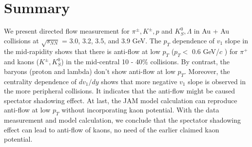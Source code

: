 \section{Summary}

We present directed flow measurement for $\pi^{\pm}, K^{\pm}, p$ and $K^0_S, \Lambda$
in Au + Au collisions at $\sqrt{s_{NN}}$ = 3.0, 3.2, 3.5, and 3.9 GeV.
The $p_T$ dependence of $v_1$ slope in the mid-rapidity shows
that there is anti-flow at low $p_T$ ($p_T <$ 0.6 GeV/$c$ ) for $\pi^{+}$ and kaons ($K^{\pm}, K^0_S$) in the mid-central 10 - 40\% collisions.
By contrast, the baryons (proton and lambda) don't show anti-flow at low $p_T$.
Moreover, the centrality dependence of $dv_1/dy$ shows
that more negative $v_1$ slope is observed in the more peripheral collisions.
It indicates that the anti-flow might be caused spectator shadowing effect.
At last, the JAM model calculation can reproduce anti-flow at low $p_T$ without incorporating kaon potential.
With the data measurement and model calculation,
we conclude that the spectator shadowing effect can lead to anti-flow of kaons, no need of the earlier claimed kaon potential.

